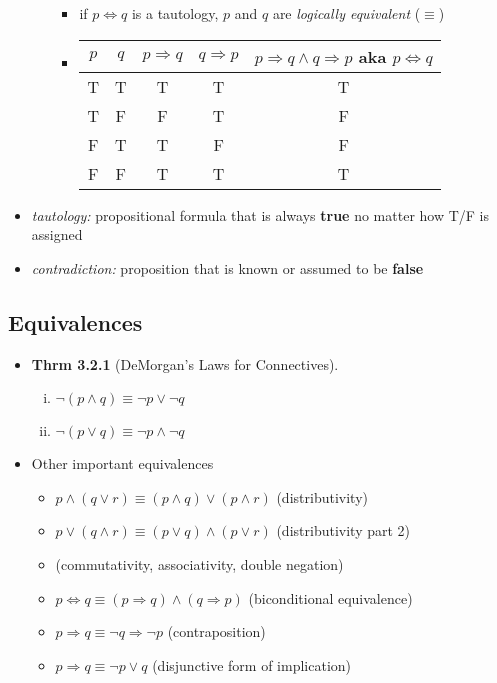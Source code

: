 \documentclass[11pt]{article}
\theoremstyle{definition}
\begin{document}
\begin{itemize}
\begin{itemize}
\begin{itemize}
            \item if $p \Leftrightarrow q$ is a tautology, $p$ and $q$ are \emph{logically equivalent} ($\equiv$)
            \item \begin{tabular}{c|c|c|c|c}
                $p$ & $q$ & $p \Rightarrow q$ & $q \Rightarrow p$ & $p \Rightarrow q \wedge q \Rightarrow p$ aka $p \Leftrightarrow q$\\ \hline
                T & T & T & T & T \\
                T & F & F & T & F \\
                F & T & T & F & F \\
                F & F & T & T & T
            \end{tabular}
        \end{itemize}
    \end{itemize}
    \item \emph{tautology:} propositional formula that is always \textbf{true} no matter how T/F is assigned
    \item \emph{contradiction:} proposition that is known or assumed to be \textbf{false}
\end{itemize}    
\newpage
\subsection*{Equivalences}
\begin{itemize}
    \item \textbf{Thrm 3.2.1} (DeMorgan's Laws for Connectives).
    \begin{enumerate}[(i)]
        \item $\neg(p\wedge q) \equiv \neg p \vee \neg q$
        \item $\neg(p\vee q) \equiv \neg p \wedge \neg q$
    \end{enumerate}
    \item Other important equivalences
    \begin{itemize}
        \item $p \wedge (q\vee r) \equiv (p\wedge q) \vee (p\wedge r)$ (distributivity)
        \item $p \vee (q \wedge r) \equiv (p \vee q) \wedge (p \vee r)$ (distributivity part 2)
        \item (commutativity, associativity, double negation)
        \item $p \Leftrightarrow q \equiv (p \Rightarrow q) \wedge (q \Rightarrow p)$ (biconditional equivalence)
        \item $p \Rightarrow q \equiv \neg q \Rightarrow \neg p$ (contraposition)
        \item $p \Rightarrow q \equiv \neg p \vee q$ (disjunctive form of implication)
    \end{itemize}
\end{itemize}
\end{document}
